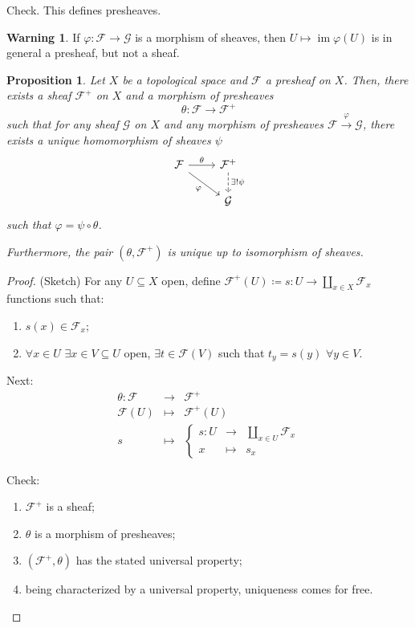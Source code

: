 \documentclass[12pt]{article}
\DeclareMathOperator{\im}{im}
\newtheorem*{proposition}{Proposition}
\theoremstyle{definition}
\newtheorem*{warning}{Warning}
\begin{document}
Check. This defines presheaves.

\begin{warning}
If $\varphi:\mathcal F\rightarrow\mathcal G$ is a morphism of sheaves, then $U\mapsto\im\varphi(U)$ is in general a presheaf, but not a sheaf.
\end{warning}

\begin{proposition}
Let $X$ be a topological space and $\mathcal F$ a presheaf on $X$. Then, there exists a sheaf $\mathcal F^+$ on $X$ and a morphism of presheaves
\[\theta:\mathcal F\longrightarrow\mathcal F^+\]
such that for any sheaf $\mathcal G$ on $X$ and any morphism of presheaves $\mathcal F\xrightarrow{\varphi}\mathcal G$, there exists a unique homomorphism of sheaves $\psi$
\[\begin{tikzcd}\mathcal F\arrow[r,"\theta"]\arrow[rd,"\varphi",swap]&\mathcal F^+\arrow[d,"\exists!\psi",dashed]\\&\mathcal G\end{tikzcd}\]
such that $\varphi=\psi\circ\theta$.

Furthermore, the pair $(\theta,\mathcal F^+)$ is unique up to isomorphism of sheaves.
\end{proposition}

\begin{proof}
(Sketch) For any $U\subseteq X$ open, define $\mathcal F^+(U)\coloneqq s:U\rightarrow\coprod_{x\in X}\mathcal F_x$ functions  such that:
\begin{enumerate}[label=\roman*)]
\item $s(x)\in\mathcal F_x$;
\item $\forall x\in U$ $\exists x\in V\subseteq U$ open, $\exists t\in\mathcal F(V)$ such that $t_y=s(y)$ $\forall y\in V$.
\end{enumerate}

Next:
\[\begin{array}{rcl}\theta:\mathcal F&\longrightarrow&\mathcal F^+\\\mathcal F(U)&\longmapsto&\mathcal F^+(U)\\s&\longmapsto&\left\{\begin{array}{rcl}s:U&\longrightarrow&\coprod_{x\in U}\mathcal F_x\\x&\longmapsto&s_x\end{array}\right.\end{array}\]

Check:
\begin{enumerate}[label=\arabic*)]
\item $\mathcal F^+$ is a sheaf;
\item $\theta$ is a morphism of presheaves;
\item $(\mathcal F^+,\theta)$ has the stated universal property;
\item being characterized by a universal property, uniqueness comes for free.
\end{enumerate}
\end{proof}
\end{document}
